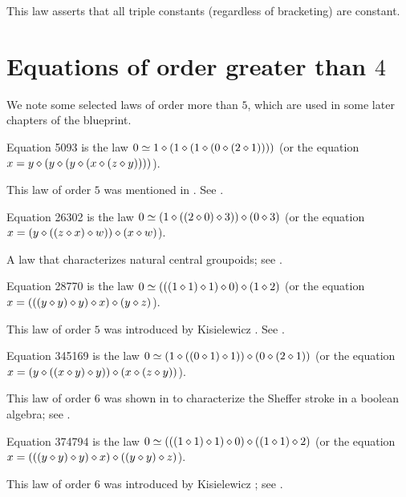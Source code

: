This law asserts that all triple constants (regardless of bracketing) are constant.

\section{Equations of order greater than \texorpdfstring{$4$}{4}}

We note some selected laws of order more than $5$, which are used in some later chapters of the blueprint.

\begin{definition}[Equation 5093]
  \label{eq5093}\leanok
  Equation 5093 is the law $0  \simeq 1 \diamond (1 \diamond (1 \diamond (0 \diamond (2 \diamond 1))))$ (or the equation $x = y \diamond (y \diamond (y \diamond (x \diamond (z \diamond y))))$).
\end{definition}

This law of order $5$ was mentioned in \cite{Kisielewicz2}.  See .

\begin{definition}[Equation 26302]
  \label{eq26302}
  Equation 26302 is the law $0  \simeq (1 \diamond ((2 \diamond 0) \diamond 3)) \diamond (0 \diamond 3)$ (or the equation $x = (y \diamond ((z \diamond x) \diamond w)) \diamond (x \diamond w)$).
\end{definition}

A law that characterizes natural central groupoids; see .

\begin{definition}[Equation 28770]
  \label{eq28770}\leanok
  Equation 28770 is the law $0  \simeq  (((1 \diamond 1) \diamond 1) \diamond 0) \diamond (1 \diamond 2)$ (or the equation $x = (((y \diamond y) \diamond y) \diamond x) \diamond (y \diamond z)$).
\end{definition}

This law of order $5$ was introduced by Kisielewicz \cite{Kisielewicz}. See .

\begin{definition}[Equation 345169]
  \label{eq345169}
  Equation 345169 is the law $0  \simeq  (1 \diamond ((0 \diamond 1) \diamond 1)) \diamond (0 \diamond (2 \diamond 1))$ (or the equation $x = (y \diamond ((x \diamond y) \diamond y)) \diamond (x \diamond (z \diamond y))$).
\end{definition}

This law of order $6$ was shown in \cite{mccune_et_al} to characterize the Sheffer stroke in a boolean algebra; see .

\begin{definition}[Equation 374794]
  \leanok
  \label{eq374794}
  Equation 374794 is the law $0  \simeq  (((1 \diamond 1) \diamond 1) \diamond 0) \diamond ((1 \diamond 1) \diamond 2)$ (or the equation $x = (((y \diamond y) \diamond y) \diamond x) \diamond ((y \diamond y) \diamond z)$).
\end{definition}

This law of order $6$ was introduced by Kisielewicz \cite{Kisielewicz}; see .
